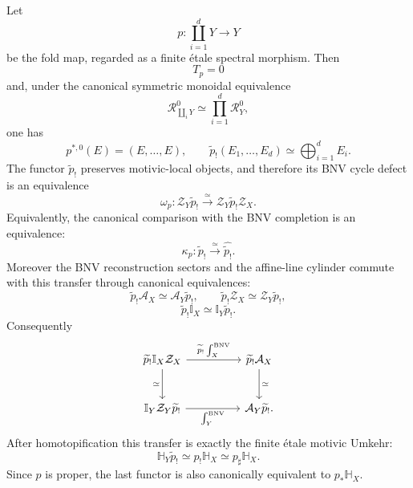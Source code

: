 \begin{theorem}
\label{thm:bn-diff-split-finite-etale}
Let
\[
  p:
  \coprod_{i=1}^{d}Y
  \longrightarrow
  Y
\]
be the fold map, regarded as a finite \'etale spectral morphism.  Then
\[
  T_p=0
\]
and, under the canonical symmetric monoidal equivalence
\[
  \mathcal R_{\coprod_iY}^0
  \simeq
  \prod_{i=1}^{d}\mathcal R_Y^0,
\]
one has
\[
  p^{*,0}(E)=(E,\ldots,E),
  \qquad
  \boxed{
  \widetilde p_!(E_1,\ldots,E_d)
  \simeq
  \bigoplus_{i=1}^{d}E_i.
  }
\]
The functor \(\widetilde p_!\) preserves motivic-local objects, and therefore
its BNV cycle defect is an equivalence
\[
  \boxed{
  \omega_p:
  \mathcal Z_Y\widetilde p_!
  \xrightarrow{\simeq}
  \mathcal Z_Y\widetilde p_!\mathcal Z_X.
  }
\]
Equivalently, the canonical comparison with the BNV completion is an
equivalence:
\[
  \boxed{
  \kappa_p:
  \widetilde p_!
  \xrightarrow{\simeq}
  \widehat{\widetilde p_!}.
  }
\]
Moreover the BNV reconstruction sectors and the affine-line cylinder commute with this
transfer through canonical equivalences:
\[
  \widetilde p_!\mathcal A_X
  \simeq
  \mathcal A_Y\widetilde p_!,
  \qquad
  \widetilde p_!\mathcal Z_X
  \simeq
  \mathcal Z_Y\widetilde p_!,
\]
\[
  \widetilde p_!\mathbb I_X
  \simeq
  \mathbb I_Y\widetilde p_!.
\]
Consequently
\[
\begin{tikzcd}[column sep=huge,row sep=large]
\widetilde p_!\mathbb I_X\mathcal Z_X
  \ar[r,"\widetilde p_!\int_X^{\mathrm{BNV}}"]
  \ar[d,"\simeq"']
&
\widetilde p_!\mathcal A_X
  \ar[d,"\simeq"]
\\
\mathbb I_Y\mathcal Z_Y\widetilde p_!
  \ar[r,"\int_Y^{\mathrm{BNV}}"']
&
\mathcal A_Y\widetilde p_!.
\end{tikzcd}
\]
After homotopification this transfer is exactly the finite \'etale motivic
Umkehr:
\[
  \boxed{
  \mathbb H_Y\widetilde p_!
  \simeq
  p_!\mathbb H_X
  \simeq
  p_\sharp\mathbb H_X.
  }
\]
Since \(p\) is proper, the last functor is also canonically equivalent to
\(p_*\mathbb H_X\).
\end{theorem}

